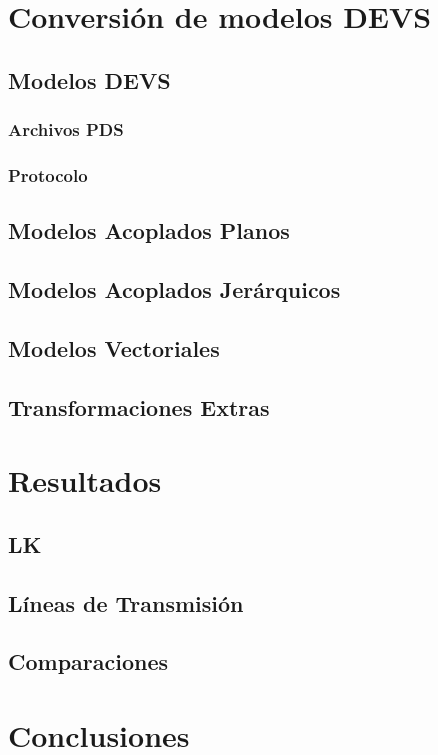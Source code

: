 \documentclass[10pt,handout]{beamer}
\begin{document}
\section{Conversión de modelos DEVS}
	\subsection{Modelos DEVS}
		\subsubsection{Archivos PDS}
		\subsubsection{Protocolo}
	\subsection{Modelos Acoplados Planos}
	\subsection{Modelos Acoplados Jerárquicos }
	\subsection{Modelos Vectoriales}
	\subsection{Transformaciones Extras}
\section{Resultados}
	\subsection{LK}
	\subsection{Líneas de Transmisión}
	\subsection{Comparaciones}
\section{Conclusiones}
\end{document}
